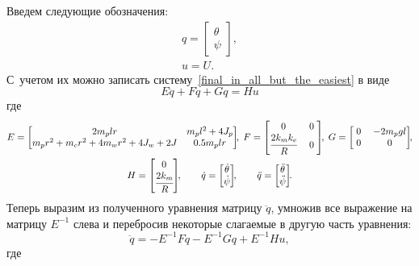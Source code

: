 \documentclass[12pt,a4paper,openany]{extarticle}
\begin{document}
Введем следующие обозначения:
\begin{gather}
	q = 
	\begin{bmatrix}
		\theta\\
		\psi
	\end{bmatrix}\!\!, 
	\\
	u = U.
\end{gather}
С~учетом их можно записать систему~\eqref{final_in_all_but_the_easiest} в виде
\begin{equation}
	E\ddot{q} + F\dot{q} + Gq = Hu
\end{equation}
где
\begin{gather}
	E = 
	\begin{bmatrix}
		2m_plr & m_pl^2 + 4J_p\\
		m_pr^2 + m_cr^2 + 4m_wr^2 + 4J_w + 2J & 0.5m_plr
	\end{bmatrix}\!\!,\;
	F = 
	\begin{bmatrix}
		0 & \phantom{!}0\phantom{!}\\
		\cfrac{2k_mk_e}{R} & 0
	\end{bmatrix}\!\!,\;
	G =
	\begin{bmatrix}
		0 & -2m_pgl\\
		\phantom{!}0\phantom{!} & 0	
	\end{bmatrix}\!\!,\notag\\
	H = 
	\begin{bmatrix}
		0\\
		\cfrac{2k_m}{R}
	\end{bmatrix}\!\!,\qquad
	\dot{q} =
	\begin{bmatrix}
		\dot{\theta}\\
		\dot{\psi}
	\end{bmatrix}\!\!,\qquad
	\ddot{q} =
	\begin{bmatrix}
		\ddot{\theta}\\
		\ddot{\psi}
	\end{bmatrix}\!\!\ldotp			 
\end{gather}
Теперь выразим из полученного уравнения матрицу $\ddot{q}$, умножив все выражение на матрицу $E^{-1}$ слева и перебросив некоторые слагаемые  в другую часть уравнения:
\begin{equation}
	\ddot{q}=-E^{-1}F\dot{q} - E^{-1}Gq + E^{-1}Hu,
\end{equation}
где
\end{document}
